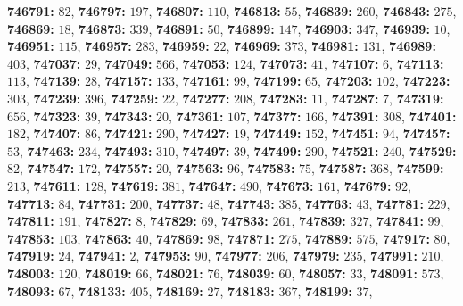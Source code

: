 \textsf{\bfseries 746791:} $82$, \textsf{\bfseries 746797:} $197$, \textsf{\bfseries 746807:} $110$, \textsf{\bfseries 746813:} $55$, \textsf{\bfseries 746839:} $260$, \textsf{\bfseries 746843:} $275$, \textsf{\bfseries 746869:} $18$, \textsf{\bfseries 746873:} $339$, \textsf{\bfseries 746891:} $50$, \textsf{\bfseries 746899:} $147$, \textsf{\bfseries 746903:} $347$, \textsf{\bfseries 746939:} $10$, \textsf{\bfseries 746951:} $115$, \textsf{\bfseries 746957:} $283$, \textsf{\bfseries 746959:} $22$, \textsf{\bfseries 746969:} $373$, \textsf{\bfseries 746981:} $131$, \textsf{\bfseries 746989:} $403$, \textsf{\bfseries 747037:} $29$, \textsf{\bfseries 747049:} $566$, \textsf{\bfseries 747053:} $124$, \textsf{\bfseries 747073:} $41$, \textsf{\bfseries 747107:} $6$, \textsf{\bfseries 747113:} $113$, \textsf{\bfseries 747139:} $28$, \textsf{\bfseries 747157:} $133$, \textsf{\bfseries 747161:} $99$, \textsf{\bfseries 747199:} $65$, \textsf{\bfseries 747203:} $102$, \textsf{\bfseries 747223:} $303$, \textsf{\bfseries 747239:} $396$, \textsf{\bfseries 747259:} $22$, \textsf{\bfseries 747277:} $208$, \textsf{\bfseries 747283:} $11$, \textsf{\bfseries 747287:} $7$, \textsf{\bfseries 747319:} $656$, \textsf{\bfseries 747323:} $39$, \textsf{\bfseries 747343:} $20$, \textsf{\bfseries 747361:} $107$, \textsf{\bfseries 747377:} $166$, \textsf{\bfseries 747391:} $308$, \textsf{\bfseries 747401:} $182$, \textsf{\bfseries 747407:} $86$, \textsf{\bfseries 747421:} $290$, \textsf{\bfseries 747427:} $19$, \textsf{\bfseries 747449:} $152$, \textsf{\bfseries 747451:} $94$, \textsf{\bfseries 747457:} $53$, \textsf{\bfseries 747463:} $234$, \textsf{\bfseries 747493:} $310$, \textsf{\bfseries 747497:} $39$, \textsf{\bfseries 747499:} $290$, \textsf{\bfseries 747521:} $240$, \textsf{\bfseries 747529:} $82$, \textsf{\bfseries 747547:} $172$, \textsf{\bfseries 747557:} $20$, \textsf{\bfseries 747563:} $96$, \textsf{\bfseries 747583:} $75$, \textsf{\bfseries 747587:} $368$, \textsf{\bfseries 747599:} $213$, \textsf{\bfseries 747611:} $128$, \textsf{\bfseries 747619:} $381$, \textsf{\bfseries 747647:} $490$, \textsf{\bfseries 747673:} $161$, \textsf{\bfseries 747679:} $92$, \textsf{\bfseries 747713:} $84$, \textsf{\bfseries 747731:} $200$, \textsf{\bfseries 747737:} $48$, \textsf{\bfseries 747743:} $385$, \textsf{\bfseries 747763:} $43$, \textsf{\bfseries 747781:} $229$, \textsf{\bfseries 747811:} $191$, \textsf{\bfseries 747827:} $8$, \textsf{\bfseries 747829:} $69$, \textsf{\bfseries 747833:} $261$, \textsf{\bfseries 747839:} $327$, \textsf{\bfseries 747841:} $99$, \textsf{\bfseries 747853:} $103$, \textsf{\bfseries 747863:} $40$, \textsf{\bfseries 747869:} $98$, \textsf{\bfseries 747871:} $275$, \textsf{\bfseries 747889:} $575$, \textsf{\bfseries 747917:} $80$, \textsf{\bfseries 747919:} $24$, \textsf{\bfseries 747941:} $2$, \textsf{\bfseries 747953:} $90$, \textsf{\bfseries 747977:} $206$, \textsf{\bfseries 747979:} $235$, \textsf{\bfseries 747991:} $210$, \textsf{\bfseries 748003:} $120$, \textsf{\bfseries 748019:} $66$, \textsf{\bfseries 748021:} $76$, \textsf{\bfseries 748039:} $60$, \textsf{\bfseries 748057:} $33$, \textsf{\bfseries 748091:} $573$, \textsf{\bfseries 748093:} $67$, \textsf{\bfseries 748133:} $405$, \textsf{\bfseries 748169:} $27$, \textsf{\bfseries 748183:} $367$, \textsf{\bfseries 748199:} $37$, 
